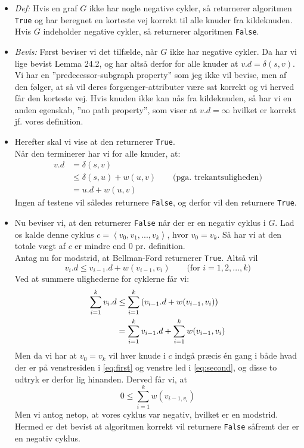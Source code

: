 \begin{itemize}
\begin{itemize}
	\begin{itemize}
		\item \textit{Def:} Hvis en graf $G$ ikke har nogle negative cykler, så returnerer algoritmen \texttt{True} og har beregnet en korteste vej korrekt til alle knuder fra kildeknuden.\\
		Hvis $G$ indeholder negative cykler, så returnerer algoritmen \texttt{False}.
		\item \textit{Bevis:} Først beviser vi det tilfælde, når $G$ ikke har negative cykler. Da har vi lige bevist Lemma 24.2, og har altså derfor for alle knuder at $v.d = \delta(s, v)$. Vi har en ''predecessor-subgraph property'' som jeg ikke vil bevise, men af den følger, at så vil deres forgænger-attributer være sat korrekt og vi herved får den korteste vej. Hvis knuden ikke kan nås fra kildeknuden, så har vi en anden egenskab, ''no path property'', som viser at $v.d = \infty$ hvilket er korrekt jf. vores definition.
		\item Herefter skal vi vise at den returnerer \texttt{True}.\\
		Når den terminerer har vi for alle knuder, at:
		\begin{align*}
		v.d &= \delta(s, v)\\
		    &\leq \delta(s, u) + w(u, v) \quad\quad \textrm{(pga. trekantsuligheden)}\\
		    &= u.d + w(u, v)
		\end{align*}
		Ingen af testene vil således returnere \texttt{False}, og derfor vil den returnere \texttt{True}.
		\item Nu beviser vi, at den returnerer \texttt{False} når der er en negativ cyklus i $G$. Lad os kalde denne cyklus $c = \left< v_0, v_1, ..., v_k \right>$, hvor $v_0 = v_k$. Så har vi at den totale vægt af $c$ er mindre end 0 pr. definition.\\
		Antag nu for modstrid, at Bellman-Ford returnerer \texttt{True}. Altså vil
		$$
		v_i.d \leq v_{i-1}.d + w(v_{i-1}, v_i) \quad\quad \textrm{(for $i = 1,2,...,k$)}
		$$
		Ved at summere ulighederne for cyklerne får vi:
		\begin{align}
		\sum_{i=1}^k v_i.d &\leq \sum_{i=1}^k \left(  v_{i-1}.d + w(v_{i-1}, v_i)   \right) \label{eq:first} \\
		                   &= \sum_{i=1}^k v_{i-1}.d + \sum_{i=1}^k w(v_{i-1}, v_i) \label{eq:second}
		\end{align}
		Men da vi har at $v_0 = v_k$ vil hver knude i $c$ indgå præcis én gang i både hvad der er på venstresiden i \cref{eq:first} og venstre led i \cref{eq:second}, og disse to udtryk er derfor lig hinanden. Derved får vi, at
		$$
		0 \leq \sum_{i=1}^k w(v_{i-1, v_i})
		$$
		Men vi antog netop, at vores cyklus var negativ, hvilket er en modstrid. Hermed er det bevist at algoritmen korrekt vil returnere \texttt{False} såfremt der er en negativ cyklus.
	\end{itemize}
\end{itemize}


\end{itemize}
